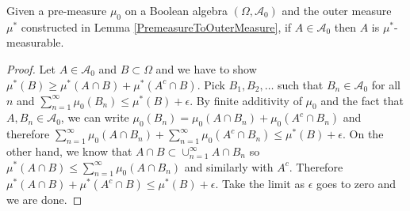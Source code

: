 \begin{lem}\label{PremeasureBooleanAlgebraOuterMeasurable}Given a pre-measure $\mu_0$ on a Boolean algebra $(\Omega,
  \mathcal{A}_0)$ and the outer measure $\mu^*$ constructed in Lemma
  \ref{PremeasureToOuterMeasure}, if $A \in \mathcal{A}_0$ then $A$ is
  $\mu^*$-measurable.
\end{lem}
\begin{proof}
Let $A \in \mathcal{A}_0$ and $B \subset \Omega$ and we have to show
$\mu^*(B) \geq \mu^*(A \cap B) + \mu^*(A^c \cap B)$. 
Pick $B_1, B_2, \dotsc$ such that $B_n \in \mathcal{A}_0$ for all $n$
and $\sum_{n=1}^\infty \mu_0(B_n) \leq \mu^*(B) + \epsilon$.  By
finite additivity of $\mu_0$ and the fact that $A, B_n \in \mathcal{A}_0$,
we can write $\mu_0 (B_n) = \mu_0(A \cap B_n) + \mu_0(A^c \cap B_n)$
and therefore $\sum_{n=1}^\infty \mu_0(A \cap B_n) + \sum_{n=1}^\infty
\mu_0(A^c \cap B_n) \leq \mu^*(B) + \epsilon$.  On the other hand, we
know that $A \cap B \subset \cup_{n=1}^\infty A \cap B_n$ so $\mu^*(A
\cap B) \leq \sum_{n=1}^\infty \mu_0( A \cap B_n)$ and similarly with
$A^c$.  Therefore $\mu^*(A \cap B) + \mu^*(A^c \cap B)\leq \mu^*(B) + \epsilon$.
Take the limit as $\epsilon$ goes to zero and we are done.
\end{proof}

